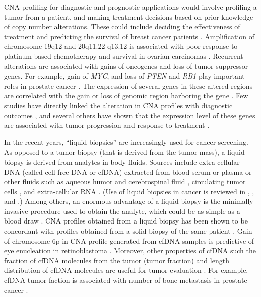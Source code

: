 CNA profiling for diagnostic and prognostic applications would involve
profiling a tumor from a patient, and making treatment decisions based
on prior knowledge of copy number alterations.
%
These could include deciding the effectiveness of treatment and
predicting the survival of breast cancer patients
\citep{stuart2009linking,hicks2006novel}.
Amplification of chromosome 19q12 and 20q11.22-q13.12 is associated with
poor response to platinum-based chemotherapy and survival in ovarian
carcinomas \citep{etemadmoghadam2009integrated}.
%
Recurrent alterations are associated with gains of oncogenes and loss of
tumor suppressor genes. For example, gain of \emph{MYC}, and loss of
\emph{PTEN} and \emph{RB1} play important roles in prostate cancer
\citep{alexander2018utility}.
%
The expression of several genes in these altered regions are correlated
with the gain or loss of genomic region harboring the gene
\citep{pollack2002microarray,chitale2009integrated,lu2011integrated}.
%
Few studies have directly linked the alteration in CNA profiles with
diagnostic outcomes \citep{etemadmoghadam2009integrated,
bardelli2013amplification,berry2018genomic}, and several others have
shown that the expression level of these genes are associated with tumor
progression and response to treatment \citep{shattuck2008met,
gorre2001clinical,villanueva2013concurrent}.

In the recent years, ``liquid biopsies'' are increasingly used for
cancer screening. As opposed to a tumor biopsy (that is derived from the
tumor mass), a liquid biopsy is derived from analytes in body fluids.
Sources include extra-cellular DNA (called cell-free DNA or cfDNA)
extracted from blood serum or plasma
\citep{leary2012detection,chan2013cancer,li2017cell} or other fluids
such as aqueous humor \citep{berry2017potential} and cerebrospinal fluid
\citep{mouliere2018detection}, circulating tumor cells
\citep{dago2014rapid}, and extra-cellular RNA
\citep{zaporozhchenko2018potential}.  (Use of liquid biopsies in cancer
is reviewed in \cite{heitzer2019current} , \cite{crowley2013liquid},
and \cite{schwarzenbach2011cell}.)
%
Among others, an enormous advantage of a liquid biopsy is the minimally
invasive procedure used to obtain the analyte, which could be as simple
as a blood draw \citep{heitzer2019current}.
%
CNA profiles obtained from a liquid biopsy has been shown to be
concordant with profiles obtained from a solid biopsy of the same
patient \citep{chan2013cancer,berry2017potential}.
%
Gain of chromosome 6p in CNA profile generated from cfDNA samples is
predictive of eye enucleation in retinoblastoma
\citep{berry2018genomic}.
%
Moreover, other properties of cfDNA such the fraction of cfDNA molecules
from the tumor (tumor fraction) and length distribution of cfDNA
molecules are useful for tumor evaluation \citep{choudhury2018tumor,
mouliere2018enhanced,underhill2016fragment,cristiano2019genome}.  For
example, cfDNA tumor faction is associated with number of bone
metastasis in prostate cancer \citep{choudhury2018tumor}.


